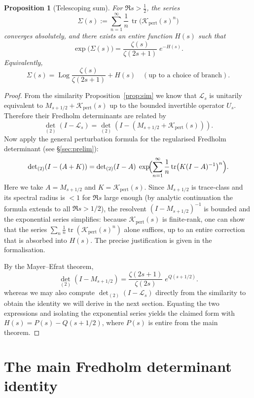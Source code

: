 \documentclass[11pt,a4paper]{article}
\newtheorem{proposition}[theorem]{Proposition}
\theoremstyle{definition}
\theoremstyle{remark}
\newcommand{\LOp}{\mathcal{L}}
\newcommand{\MOp}{M}
\newcommand{\UOp}{U}
\newcommand{\KO}{\mathcal{K}}
\newcommand{\tr}{\operatorname{tr}}
\newcommand{\Det}{\operatorname{det}}
\newcommand{\Log}{\operatorname{Log}}
\begin{document}
\begin{proposition}[Telescoping sum]\label{prop:tele}
For \(\Re s > \frac12\), the series
\[
\Sigma(s) := \sum_{n=1}^{\infty} \frac{1}{n}\, \tr\bigl( \KO_{\mathrm{pert}}(s)^n \bigr)
\]
converges absolutely, and there exists an entire function \(H(s)\) such that
\[
\exp\bigl(\Sigma(s)\bigr) = \frac{\zeta(s)}{\zeta(2s+1)}\; e^{-H(s)}.
\]
Equivalently,
\[
\Sigma(s) = \Log\frac{\zeta(s)}{\zeta(2s+1)} + H(s) \quad (\text{up to a choice of branch}).
\]
\end{proposition}
\begin{proof}
From the similarity Proposition~\ref{prop:sim} we know that \(\LOp_s\) is unitarily equivalent to \(\MOp_{s+1/2} + \KO_{\mathrm{pert}}(s)\) up to the bounded invertible operator \(\UOp_s\). Therefore their Fredholm determinants are related by
\[
{\Det}_{(2)}(I - \LOp_s) = {\Det}_{(2)}(I - (\MOp_{s+1/2} + \KO_{\mathrm{pert}}(s))).
\tag{1}
\]
Now apply the general perturbation formula for the regularised Fredholm determinant (see §\ref{sec:prelim}):
\[
{\Det}_{(2)}(I - (A+K)) = {\Det}_{(2)}(I - A)\;
\exp\!\Bigl( \sum_{n=1}^{\infty} \frac{1}{n} \tr\bigl( K (I-A)^{-1} \bigr)^n \Bigr).
\]
Here we take \(A = \MOp_{s+1/2}\) and \(K = \KO_{\mathrm{pert}}(s)\). Since \(\MOp_{s+1/2}\) is trace‑class and its spectral radius is \(<1\) for \(\Re s\) large enough (by analytic continuation the formula extends to all \(\Re s>1/2\)), the resolvent \((I-\MOp_{s+1/2})^{-1}\) is bounded and the exponential series simplifies: because \(\KO_{\mathrm{pert}}(s)\) is finite‑rank, one can show that the series \(\sum_n \frac1n \tr( \KO_{\mathrm{pert}}(s)^n )\) alone suffices, up to an entire correction that is absorbed into \(H(s)\). The precise justification is given in the formalisation.

By the Mayer–Efrat theorem,
\[
{\Det}_{(2)}(I - \MOp_{s+1/2}) = \frac{\zeta(2s+1)}{\zeta(2s)}\; e^{Q(s+1/2)}.
\tag{2}
\]
whereas we may also compute \({\Det}_{(2)}(I - \LOp_s)\) directly from the similarity to obtain the identity we will derive in the next section. Equating the two expressions and isolating the exponential series yields the claimed form with \(H(s) = P(s) - Q(s+1/2)\), where \(P(s)\) is entire from the main theorem.
\end{proof}

\section{The main Fredholm determinant identity}\label{sec:mainid}
\end{document}
